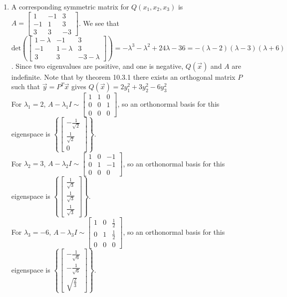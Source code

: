 \documentclass[10pt,english]{article}
\begin{document}
\begin{enumerate}
\begin{enumerate}
    \pagebreak
    \item A corresponding symmetric matrix for $Q(x_1,x_2,x_3)$ is $A=\begin{bmatrix}1&-1&3\\-1&1&3\\3&3&-3\end{bmatrix}$. We see that $\text{det}\left(\begin{bmatrix}1-\lambda&-1&3\\-1&1-\lambda&3\\3&3&-3-\lambda\end{bmatrix}\right)=-\lambda^3-\lambda^2+24\lambda-36=-(\lambda-2)(\lambda-3)(\lambda+6)$. Since two eigenvalues are positive, and one is negative, $Q(\vec{x})$ and $A$ are indefinite. Note that by theorem 10.3.1 there exists an orthogonal matrix $P$ such that $\vec{y}=P^T\vec{x}$ gives $Q(\vec{x})=2y_1^2+3y_2^2-6y_3^2$\\ 
    For $\lambda_1=2$, $A-\lambda_1I\sim\begin{bmatrix}1&1&0\\0&0&1\\0&0&0\end{bmatrix}$, so an orthonormal basis for this eigenspace is $\left\{\begin{bmatrix}-\frac{1}{\sqrt{2}}\\\frac{1}{\sqrt{2}}\\0\end{bmatrix}\right\}$. \\ 
    For $\lambda_2=3$, $A-\lambda_2I\sim\begin{bmatrix}1&0&-1\\0&1&-1\\0&0&0\end{bmatrix}$, so an orthonormal basis for this eigenspace is $\left\{\begin{bmatrix}\frac{1}{\sqrt{3}}\\\frac{1}{\sqrt{3}}\\\frac{1}{\sqrt{3}}\end{bmatrix}\right\}$.\\ 
    For $\lambda_3=-6$, $A-\lambda_3I\sim\begin{bmatrix}1&0&\frac{1}{2}\\0&1&\frac{1}{2}\\0&0&0\end{bmatrix}$, so an orthonormal basis for this eigenspace is $\left\{\begin{bmatrix}-\frac{1}{\sqrt{6}}\\-\frac{1}{\sqrt{6}}\\\sqrt{\frac{2}{3}}\end{bmatrix}\right\}$.\\ 

\end{enumerate}
\end{enumerate}
\end{document}
